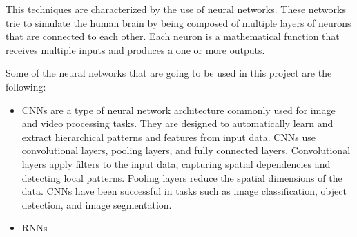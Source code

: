 This techniques are characterized by the use of neural networks. These networks trie to simulate the human brain by being composed of multiple layers of neurons that are connected to each other. Each neuron is a mathematical function that receives multiple inputs and produces a one or more outputs.

Some of the neural networks that are going to be used in this project are the following:

\begin{itemize}
	\item CNNs are a type of neural network architecture commonly used for image and video processing tasks. They are designed to automatically learn and extract hierarchical patterns and features from input data. CNNs use convolutional layers, pooling layers, and fully connected layers. Convolutional layers apply filters to the input data, capturing spatial dependencies and detecting local patterns. Pooling layers reduce the spatial dimensions of the data. CNNs have been successful in tasks such as image classification, object detection, and image segmentation.
	\item RNNs
\end{itemize}


